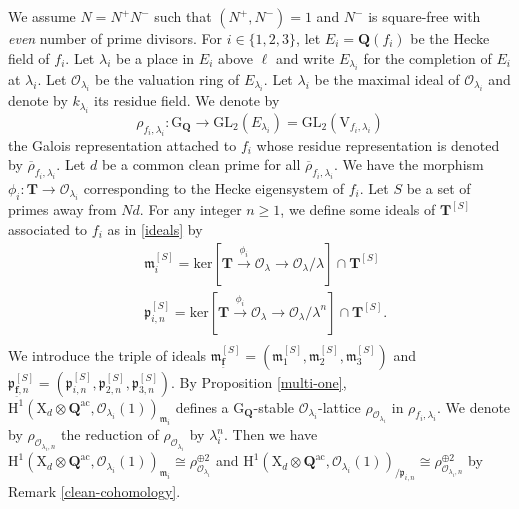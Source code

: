 \documentclass[10pt]{amsart}
\numberwithin{equation}{section}
\theoremstyle{plain}
\numberwithin{equation}{section}
\theoremstyle{definition}
\theoremstyle{remark}
\def\GL{\mathrm{GL}}
\def\ac{\mathrm{ac}}
\def\frakm{\mathfrak{m}}
\def\ac{\mathrm{ac}}
\def\triplef{\underline{\mathbf{f}}}
\def\calO{\mathcal{O}}
\def\frakm{\mathfrak{m}}
\def\frakp{\mathfrak{p}}
\def\QQ{\mathbf{Q}}
\def\TT{\mathbf{T}}
\def\rmG{\mathrm{G}}
\def\rmH{\mathrm{H}}
\def\rmX{\mathrm{X}}
\def\rmV{\mathrm{V}}
\begin{document}
We assume $N=N^{+}N^{-}$ such that $(N^{+}, N^{-})=1$ and $N^{-}$ is square-free with \emph{even} number of prime divisors.  For $i\in\{1, 2, 3\}$, let $E_{i}=\QQ(f_{i})$ be the Hecke field of $f_{i}$. Let $\lambda_{i}$ be a place in $E_{i}$ above $\ell$ and write $E_{\lambda_{i}}$ for the completion of $E_{i}$ at $\lambda_{i}$. Let $\calO_{\lambda_{i}}$ be the valuation ring of $E_{\lambda_{i}}$. Let $\lambda_{i}$ be the maximal ideal of $\calO_{\lambda_{i}}$ and denote by $k_{\lambda_{i}}$ its residue field. We denote by 
\begin{equation*}
\rho_{f_{i}, \lambda_{i}}:\rmG_{\QQ}\rightarrow \GL_{2}({E_{\lambda_{i}}})=\GL_{2}(\rmV_{f_{i},\lambda_{i}})
\end{equation*}
the Galois representation attached to $f_{i}$ whose residue representation is denoted by $\overline{\rho}_{f_{i},\lambda_{i}}$. Let $d$ be a common clean prime for all $\overline{\rho}_{f_{i},\lambda_{i}}$. We have the morphism $\phi_{i}: \TT\rightarrow \calO_{\lambda_{i}}$ corresponding to the Hecke eigensystem of $f_{i}$. Let $S$ be a set of primes away from $Nd$. For any integer $n\geq 1$,  we define some ideals of $\TT^{[S]}$ associated to $f_{i}$ as in \ref{ideals} by
\begin{equation*}
\begin{aligned}
&\frakm^{[S]}_{i}=\mathrm{ker}[\TT \xrightarrow{\phi_{i}} \calO_{\lambda}\rightarrow \calO_{\lambda}/\lambda]\cap\TT^{[S]}\\ 
&\frakp^{[S]}_{i, n}=\mathrm{ker}[\TT\xrightarrow{\phi_{i}}\calO_{\lambda}\rightarrow \calO_{\lambda}/\lambda^{n}]\cap\TT^{[S]}.\\
\end{aligned}
\end{equation*}
We introduce the triple of ideals $\frakm^{[S]}_{\triplef}=(\frakm^{[S]}_{1}, \frakm^{[S]}_{2}, \frakm^{[S]}_{3})$ and $\frakp^{[S]}_{\triplef, n}=(\frakp^{[S]}_{i, n}, \frakp^{[S]}_{2, n}, \frakp^{[S]}_{3, n})$.
 By Proposition \ref{multi-one}, $\rmH^{1}(\rmX_{d}\otimes {\QQ^{\ac}}, \calO_{\lambda_{i}}(1))_{\frakm_{i}}$ defines a $\rmG_{\QQ}$-stable $\calO_{\lambda_{i}}$-lattice $\rho_{\calO_{\lambda_{i}}}$ in $\rho_{f_i, \lambda_{i}}$. We denote by $\rho_{\calO_{\lambda_{i}, n}}$ the reduction of $\rho_{\calO_{\lambda_{i}}}$ by $\lambda^{n}_{i}$. Then we have $\rmH^{1}(\rmX_{d}\otimes {\QQ^{\ac}}, \calO_{\lambda_{i}}(1))_{\frakm_{i}}\cong \rho^{\oplus 2}_{\calO_{\lambda_{i}}}$ and $\rmH^{1}(\rmX_{d}\otimes{\QQ^{\ac}}, \calO_{\lambda_{i}}(1))_{/\frakp_{i,n}}\cong \rho^{\oplus 2}_{\calO_{\lambda_{i}, n}}$
by Remark \ref{clean-cohomology}.  
\end{document}
